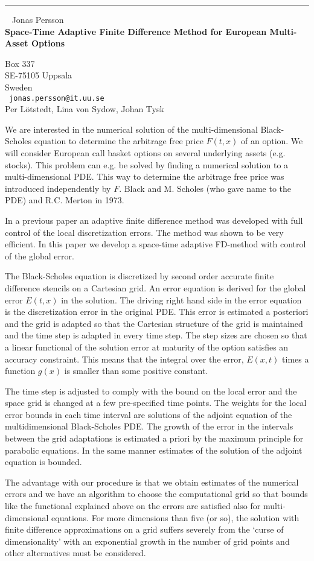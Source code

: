 \documentclass{report}
\begin{document}
\begin{center}

\rule{6in}{1pt} \
{\large
Jonas Persson
\\ {\bf
Space-Time Adaptive Finite Difference Method for European Multi-Asset
Options
}}

Box 337 \\
SE-75105 Uppsala \\
Sweden
\\ {\tt
jonas.persson@it.uu.se
}
\\
Per L\"{o}tstedt,
Lina von Sydow,
Johan Tysk


\end{center}

We are interested in the numerical solution of the multi-dimensional
Black-Scholes equation to determine the arbitrage free price
$F(t,x)$ of
an option. We will consider European call basket options on several
underlying assets (e.g. stocks). This problem can e.g. be solved by
finding a numerical solution to a multi-dimensional PDE. This way to
determine the arbitrage free price was introduced independently by $F$.
Black and M. Scholes (who gave name to the PDE) and R.C. Merton in
1973.

In a previous paper an adaptive finite difference method was developed
with full control of the local discretization errors. The method was
shown to be very efficient. In this paper we develop a space-time
adaptive FD-method with control of the global error.

The Black-Scholes equation is discretized by second order accurate
finite difference stencils on a Cartesian grid. An error equation is
derived for the global error $E(t,x)$ in the solution. The driving right
hand side in the error equation is the discretization error in the
original PDE. This error is estimated a posteriori and the grid is
adapted so that the Cartesian structure of the grid is maintained and
the time step is adapted in every time step. The step sizes are chosen
so that a linear functional of the solution error at maturity of the
option satisfies an accuracy constraint. This means that the integral
over the error, $E(x,t)$ times a function $g(x)$ is smaller than some
positive constant.

The time step is adjusted to comply with the bound on the local error
and the space grid is changed at a few pre-specified time points. The
weights for the local error bounds in each time interval are solutions
of the adjoint equation of the multidimensional Black-Scholes PDE. The
growth of the error in the intervals between the grid adaptations is
estimated a priori by the maximum principle for parabolic equations. In
the same manner estimates of the solution of the adjoint equation is
bounded.

The advantage with our procedure is that we obtain estimates of the
numerical errors and we have an algorithm to choose the computational
grid so that bounds like the functional explained above on the errors
are satisfied also for multi-dimensional equations. For more dimensions
than five (or so), the solution with finite difference approximations
on a grid suffers severely from the `curse of dimensionality' with an
exponential growth in the number of grid points and other alternatives
must be considered. 
\end{document}
